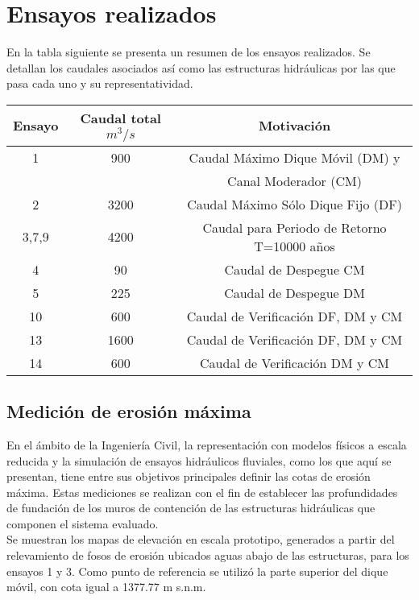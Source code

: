 
\section{Ensayos realizados}
En la tabla siguiente se presenta un resumen de los ensayos realizados. Se detallan los caudales asociados así como las estructuras hidráulicas por las que pasa cada uno y su representatividad.\\

\begin{tabular}{ccc}
\hline
Ensayo  & Caudal total $m^{3}/s$ & Motivación \\
\hline
1 & 900 & Caudal Máximo Dique Móvil (DM) y \\
  &     & Canal Moderador (CM) \\
\hline
2 & 3200 & Caudal Máximo Sólo Dique Fijo (DF) \\
\hline
3,7,9 & 4200 & Caudal para Periodo de Retorno T=10000 años \\
\hline
4 & 90 & Caudal de Despegue CM \\
\hline
5 & 225 & Caudal de Despegue DM \\
\hline
10 & 600 & Caudal de Verificación DF, DM y CM
 \\
\hline
13 & 1600 & Caudal de Verificación DF, DM y CM
 \\
\hline
14 & 600 & Caudal de Verificación DM y CM
 \\
\hline
\end{tabular}

\newpage %

\subsection{Medición de erosión máxima}
\label{sec:ensayo-erosion-maxima}

En el ámbito de la Ingeniería Civil, la representación con modelos físicos a escala reducida y la simulación de ensayos hidráulicos fluviales, como los que aquí se presentan, tiene entre sus objetivos principales definir las cotas de erosión máxima. Estas mediciones se realizan con el fin de establecer las profundidades de fundación de los muros de contención de las estructuras hidráulicas que componen el sistema evaluado. \\
Se muestran los mapas de elevación en escala prototipo, generados a partir del relevamiento de fosos de erosión ubicados aguas abajo de las estructuras, para los ensayos 1 y 3. Como punto de referencia se utilizó la parte superior del dique móvil, con cota igual a 1377.77 m s.n.m.\\

